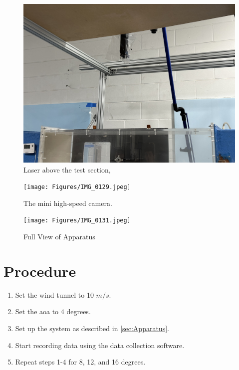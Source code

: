 \begin{figure}[htpb]
    \centering
    \includegraphics[width=0.75\linewidth]{Figures/IMG_0130.jpeg}
    \caption{Laser above the test section,}
    \label{fig:Laser}
\end{figure}


\begin{figure}[htpb]
    \centering
    \texttt{[image: Figures/IMG\_0129.jpeg]}
    \caption{The mini high-speed camera.}
    \label{fig:High_Speed_Camera}
\end{figure}


\begin{figure}[htpb]
    \centering
    \texttt{[image: Figures/IMG\_0131.jpeg]}
    \caption{Full View of Apparatus}
    \label{fig:Full_Apparatus}
\end{figure}

\section{Procedure} \label{sec:Prodedure}

\begin{enumerate}
\item Set the wind tunnel to 10 $m/s$.
\item Set the \acrshort{aoa} to 4 degrees.
\item Set up the system as described in \autoref{sec:Apparatus}.
\item Start recording data using the data collection software.
\item Repeat steps 1-4 for 8, 12, and 16 degrees.
\end{enumerate}

